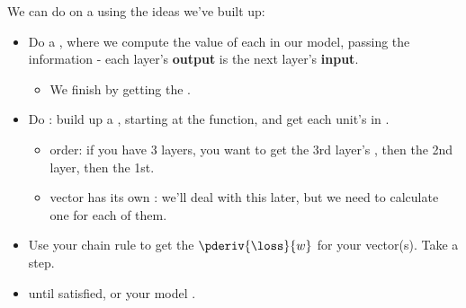         \begin{concept}
            We can do  on a  using the ideas we've built up:
            
            \boxdiv
            
            \begin{itemize}
                \item Do a , where we compute the value of each  in our model, passing the information  - each layer's \textbf{output} is the next layer's \textbf{input}.
                    \begin{itemize}
                        \item We finish by getting the .
                    \end{itemize}
                    
            \boxdiv
                    
                \item Do : build up a , starting at the  function, and get each unit's  in .
                    \begin{itemize}
                        \item {} order: if you have 3 layers, you want to get the 3rd layer's , then the 2nd layer, then the 1st.
                        
                        \item {} vector has its own : we'll deal with this later, but we need to calculate one for each of them.
                    \end{itemize}
                    
            \boxdiv
                
                \item Use your chain rule to get the  $\pderiv{\loss}{w}$ for your  vector(s). Take a  step.
                
                \item {} until satisfied, or your model .
            \end{itemize}
        \end{concept}
        
        
        